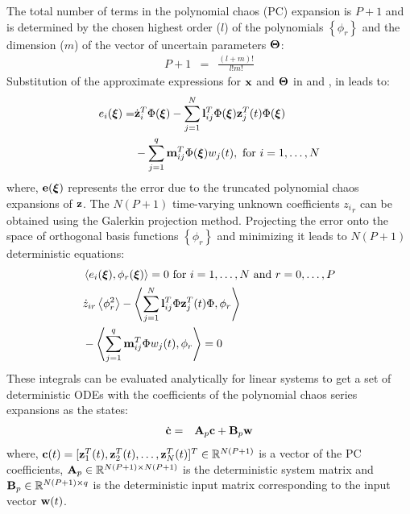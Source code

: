 \documentclass[10pt, conference]{IEEEtran}
\begin{document}
The total number of terms in the polynomial chaos (PC) expansion is $P+1$ and is determined by the chosen highest order ($l$) of the polynomials $\left\{\phi_r\right\}$ and the dimension ($m$) of the vector of uncertain parameters $\boldsymbol{\Theta}$:
\begin{eqnarray}
P+1 &=& \frac{(l+m)!}{l!m!} \label{numterms}
\end{eqnarray}
Substitution of the approximate expressions for $\mathbf{x}$ and $\boldsymbol{\Theta}$ in  and , in  leads to:
\begin{align}\notag
e_i(\boldsymbol{\xi}) = &\dot{\mathbf{z}}_i^T\Phi(\boldsymbol{\xi})-\sum_{j=1}^N{\mathbf{l}_{ij}^T\Phi(\boldsymbol{\xi})\mathbf{z}_j^T(t)\Phi(\boldsymbol{\xi})}\\
&-\sum_{j=1}^q{\mathbf{m}_{ij}^T\Phi(\boldsymbol{\xi})w_j(t)},\ \mbox{for $i = 1,\ldots,N$} \label{erreq}
\end{align}
where, $\mathbf{e}(\boldsymbol{\xi})$ represents the error due to the truncated polynomial chaos expansions of $\mathbf{z}$. The $N(P+1)$ time-varying unknown coefficients ${z_i}_r$ can be obtained using the Galerkin projection method. Projecting the error onto the space of orthogonal basis functions $\left\{\phi_r\right\}$ and minimizing it leads to $N(P+1)$ deterministic equations:
\begin{align}
&\left\langle e_i(\boldsymbol{\xi}),\phi_r(\boldsymbol{\xi})\right\rangle = 0 \mbox{ for $i = 1,\ldots,N$ and $r = 0,\ldots,P$} \notag\\
&\dot{z}_{ir}\left\langle \phi_r^2 \right\rangle - \left\langle \sum_{j=1}^N{\mathbf{l}_{ij}^T\Phi\mathbf{z}_j^T(t)\Phi},\phi_r \right\rangle\notag\\
&- \left\langle \sum_{j=1}^q{\mathbf{m}_{ij}^T\Phi w_j(t)},\phi_r \right\rangle = 0
\end{align}
These integrals can be evaluated analytically for linear systems to get a set of deterministic ODEs with the coefficients of the polynomial chaos series expansions as the states:
\begin{eqnarray}
\dot{\mathbf{c}} &=& \mathbf{A}_p\mathbf{c}+\mathbf{B}_p\mathbf{w} \label{sysdet}
\end{eqnarray}
where, $\mathbf{c}(t) = [\mathbf{z}_1^T(t),\mathbf{z}_2^T(t),\ldots,\mathbf{z}_N^T(t)]^T \in \mathbb R^{N(P+1)}$ is a vector of the PC coefficients, $\mathbf{A}_p \in \mathbb R^{N(P+1)\times N(P+1)}$ is the deterministic system matrix and $\mathbf{B}_p \in \mathbb R^{N(P+1)\times q}$ is the deterministic input matrix corresponding to the input vector $\mathbf{w}(t)$.
\end{document}
